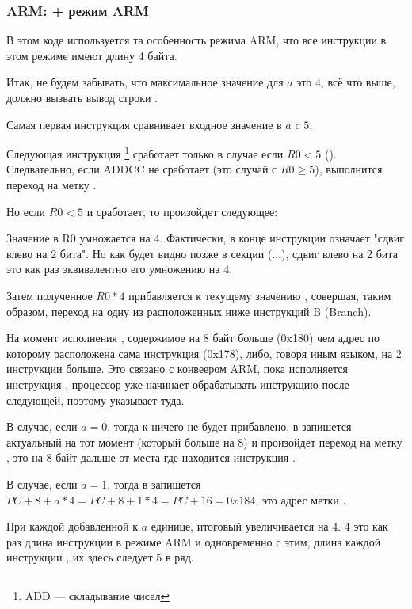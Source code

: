 ﻿%
\subsubsection{ARM: \OptimizingKeil + режим ARM}



В этом коде используется та особенность режима ARM, что все инструкции в этом режиме имеют длину 4 байта.

Итак, не будем забывать, что максимальное значение для $a$ это $4$, всё что выше, должно вызвать
вывод строки .

Самая первая инструкция  сравнивает входное значение в $a$ c $5$.

Следующая инструкция \footnote{ADD --- складывание чисел}
сработает только в случае если $R0 < 5$
(). Следвательно, если ADDCC не сработает (это случай с $R0 \geq 5$),
выполнится переход на метку .

Но если $R0 < 5$ и  сработает, то произойдет следующее:

Значение в R0 умножается на 4. 
Фактически,  в конце инструкции означает "сдвиг влево на 2 бита". Но как будет видно позже 
в секции (...), сдвиг влево на 2 бита это как раз эквивалентно его умножению на 4.

Затем полученное $R0*4$ прибавляется к текущему значению \PC, совершая, таким образом, 
переход на одну из расположенных ниже инструкций B (Branch).

На момент исполнения , содержимое \PC на 8 байт больше (0x180) чем адрес по которому 
расположена сама
инструкция  (0x178), либо, говоря иным языком, на 2 инструкции больше. 
Это связано с конвеером ARM,
пока исполняется инструкция , процессор уже начинает обрабатывать инструкцию после следующей, 
поэтому
\PC указывает туда.

В случае, если $a=0$, тогда к \PC ничего не будет прибавлено, в \PC запишется актуальный на тот момент \PC
(который больше на 8) и произойдет переход на метку , 
это на 8 байт дальше от места где находится инструкция . 

В случае, если $a=1$, тогда в \PC запишется $PC+8+a*4 = PC+8+1*4 = PC+16 = 0x184$, это адрес метки
.

При каждой добавленной к $a$ единице, итоговый \PC увеличивается на 4. 4 это как раз длина инструкции 
в режиме ARM и одновременно с этим, длина каждой инструкции , их здесь следует 5 в ряд.

